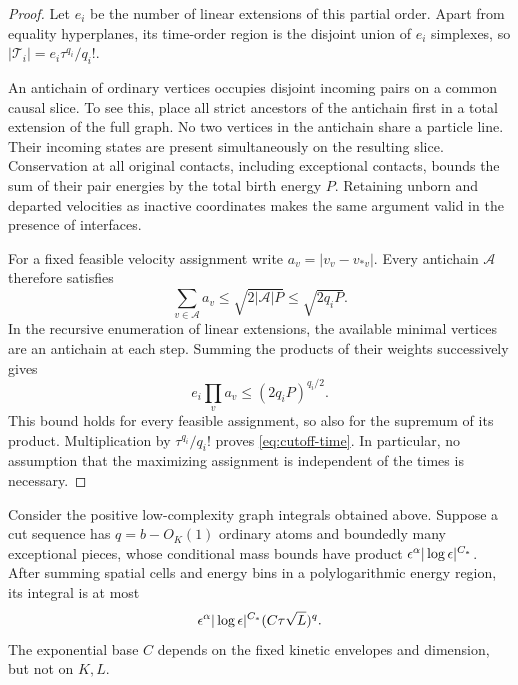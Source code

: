 \begin{proof}
Let \(e_i\) be the number of linear extensions of this partial
order.  Apart from equality hyperplanes, its time-order
region is the disjoint union of \(e_i\) simplexes, so
\(|\mathcal T_i|=e_i\tau^{q_i}/q_i!\).

An antichain of ordinary vertices occupies disjoint incoming
pairs on a common causal slice.  To see this, place all strict
ancestors of the antichain first in a total extension of the
full graph.  No two vertices in the antichain share a particle
line.  Their incoming states are present simultaneously on
the resulting slice.  Conservation at all original contacts,
including exceptional contacts, bounds the sum of their pair
energies by the total birth energy \(P\).  Retaining unborn
and departed velocities as inactive coordinates makes the
same argument valid in the presence of interfaces.

For a fixed feasible velocity assignment write
\(a_v=|v_v-v_{*v}|\).  Every antichain \(\mathcal A\)
therefore satisfies
\[
 \sum_{v\in\mathcal A}a_v
 \leq\sqrt{2|\mathcal A|P}\leq\sqrt{2q_iP}.
\]
In the recursive enumeration of linear extensions, the
available minimal vertices are an antichain at each step.
Summing the products of their weights successively gives
\[
 e_i\prod_v a_v\leq(2q_iP)^{q_i/2}.
\]
This bound holds for every feasible assignment, so also
for the supremum of its product.  Multiplication by
\(\tau^{q_i}/q_i!\) proves \eqref{eq:cutoff-time}.
In particular, no assumption that the maximizing assignment
is independent of the times is necessary.
\end{proof}

\begin{lemma}\label{lem:cutoff-sum}
Consider the positive low-complexity graph integrals obtained
above.  Suppose a cut sequence has \(q=b-O_K(1)\) ordinary
atoms and boundedly many exceptional pieces, whose conditional
mass bounds have product
\(\epsilon^\alpha|\log\epsilon|^{C_*}\).
After summing spatial cells and energy bins in a polylogarithmic
energy region, its integral is at most
\begin{equation}\label{eq:cutoff-sum}
 \epsilon^\alpha|\log\epsilon|^{C_*}
       (C\tau\sqrt L)^q .
\end{equation}
The exponential base \(C\) depends on the fixed kinetic
envelopes and dimension, but not on \(K,L\).
\end{lemma}

